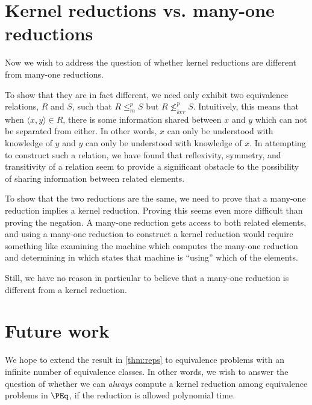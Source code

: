 \documentclass{article}
\theoremstyle{definition} \newtheorem{definition}[definition]{Definition}
\newcommand{\nkr}{\nleq^{p}_{ker}} %
\newcommand{\mor}{\leq^{p}_{m}} %
\newcommand{\pair}[2]{\langle#1,#2\rangle} %
\begin{document}

\section{Kernel reductions vs. many-one reductions} \label{sec:diffs}

Now we wish to address the question of whether kernel reductions are different
from many-one reductions.

To show that they are in fact different, we need only exhibit two equivalence
relations, $R$ and $S$, such that $R\mor S$ but $R\nkr S$. Intuitively, this
means that when $\pair{x}{y}\in R$, there is some information shared between
$x$ and $y$ which can not be separated from either. In other words, $x$ can
only be understood with knowledge of $y$ and $y$ can only be understood with
knowledge of $x$. In attempting to construct such a relation, we have found
that reflexivity, symmetry, and transitivity of a relation seem to provide a
significant obstacle to the possibility of sharing information between related
elements.

To show that the two reductions are the same, we need to prove that a many-one
reduction implies a kernel reduction. Proving this seems even more difficult
than proving the negation. A many-one reduction gets access to both related
elements, and using a many-one reduction to construct a kernel reduction would
require something like examining the machine which computes the many-one
reduction and determining in which states that machine is ``using'' which of
the elements.

Still, we have no reason in particular to believe that a many-one reduction is
different from a kernel reduction.

\section{Future work}

We hope to extend the result in \autoref{thm:reps} to equivalence problems with
an infinite number of equivalence classes. In other words, we wish to answer
the question of whether we can \emph{always} compute a kernel reduction among
equivalence problems in $\PEq$, if the reduction is allowed polynomial time.
\end{document}

